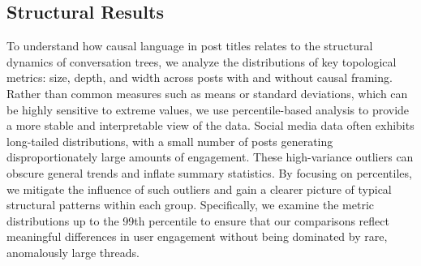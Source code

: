 \documentclass[acmsmall]{acmart}
\begin{document}
\subsection{Structural Results}
To understand how causal language in post titles relates to the structural dynamics of conversation trees, we analyze the distributions of key topological metrics: size, depth, and width across posts with and without causal framing. Rather than common measures such as means or standard deviations, which can be highly sensitive to extreme values, we use percentile-based analysis to provide a more stable and interpretable view of the data. Social media data often exhibits long-tailed distributions, with a small number of posts generating disproportionately large amounts of engagement. These high-variance outliers can obscure general trends and inflate summary statistics. By focusing on percentiles, we mitigate the influence of such outliers and gain a clearer picture of typical structural patterns within each group. Specifically, we examine the metric distributions up to the 99th percentile to ensure that our comparisons reflect meaningful differences in user engagement without being dominated by rare, anomalously large threads.
\end{document}
